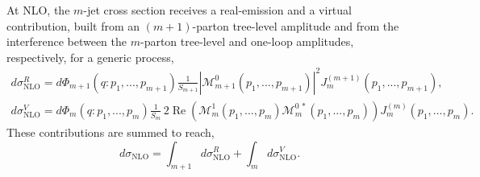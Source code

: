At NLO, the $m$-jet cross section receives a real-emission and a virtual
contribution, built from an $(m+1)$-parton tree-level amplitude and from the
interference between the $m$-parton tree-level and one-loop amplitudes,
respectively, for a generic process,
\begin{equation}
    \begin{gathered}
        d\sigma^R_\text{NLO} = d\Phi_{m+1}(q:p_1,...,p_{m+1})\frac1{S_{m+1}}|\mathcal M_{m+1}^0(p_1,...,p_{m+1})|^2J_m^{(m+1)}(p_1,...,p_{m+1}),\\
        d\sigma^V_\text{NLO} = d\Phi_m(q:p_1,...,p_m)\frac1{S_m}\,2\operatorname{Re}\!\left(\mathcal M_m^1(p_1,...,p_m)\mathcal M_m^{0\,*}(p_1,...,p_m)\right)J_m^{(m)}(p_1,...,p_m).
    \end{gathered}
\end{equation}
These contributions are summed to reach,
\begin{equation}\label{eq:nloCrossGeneric}
    d\sigma_\text{NLO} = \int_{m+1}d\sigma^R_\text{NLO}+\int_m d\sigma^V_\text{NLO}.
\end{equation}

